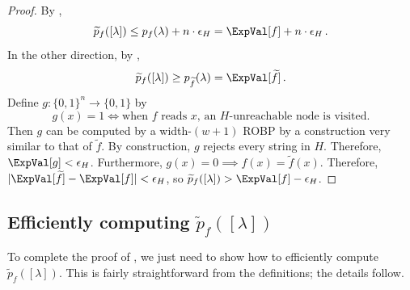 \begin{proof}
By ,
$$
\widetilde{p}_f([\lambda]) \leq p_f(\lambda) + n \cdot \epsilon_H = \ExpVal[f] + n \cdot \epsilon_H\,.
$$
In the other direction, by ,
$$
\widetilde{p}_f([\lambda]) \geq p_{\widetilde{f}}(\lambda) = \ExpVal[\widetilde{f}]\,.
$$
Define $g \colon \{0, 1\}^n \to \{0, 1\}$ by
$$
g(x) = 1 \iff \text{when $f$ reads $x$, an $H$-unreachable node is visited}.
$$
Then $g$ can be computed by a width-$(w + 1)$ ROBP by a construction very similar to that of $\widetilde{f}$. By construction, $g$ rejects every string in $H$. Therefore, $\ExpVal[g] < \epsilon_H$. Furthermore, $g(x) = 0 \implies f(x) = \widetilde{f}(x)$. Therefore, $|\ExpVal[\widetilde{f}] - \ExpVal[f]| < \epsilon_H$, so $\widetilde{p}_f([\lambda]) > \ExpVal[f] - \epsilon_H$.
\end{proof}


\subsection{Efficiently computing $\widetilde{p}_f([\lambda])$} \label{sec:const-width-efficiency}

To complete the proof of , we just need to show how to efficiently compute $\widetilde{p}_f([\lambda])$. This is fairly straightforward from the definitions; the details follow.

